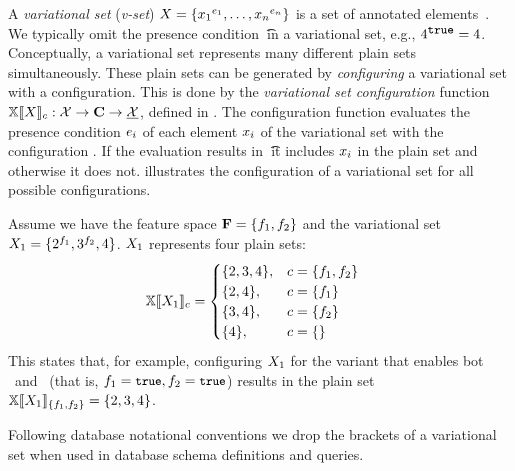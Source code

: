 A \emph{variational set} (\emph{v-set}) $\vset = \setDef {\annot [\dimMeta_1] {\elem_1},\ldots, \annot [\dimMeta_n] {\elem_n}}$ 
is a set of annotated elements~\cite{EWC13fosd,Walk14onward,ATW17dbpl}.
We typically omit the presence condition \t\ in a variational set,
e.g., $\annot [\t] 4 = 4$.
%
Conceptually, a variational set represents many different plain sets simultaneously.
These plain sets can be generated by \emph{configuring} a variational set with a configuration.
This is done by the \emph{variational set configuration} function
\ensuremath{\osetSem \vset: \vsetSet \to \confSet \to \psetSet}, defined in .
The configuration function evaluates the presence condition $\dimMeta_i$ of each 
element $\elem_i$ of the variational set with the configuration \config. 
If the evaluation results in \t\ it includes $\elem_i$ in the plain set and otherwise it
does not.  illustrates the configuration of a variational set for all
possible configurations. 

\begin{example}
\label{eg:vset-conf}
Assume we have the feature space $\fSet = \setDef {\A, \B}$ 
and the variational set $\vset_1 = \setDef {\annot [\A] 2, \annot [\B] 3, 4}$.
$\vset_1$ represents four plain sets:
\begin{alignat*}{1}
\osetSem {\vset_1} &=
\begin{cases}
  \setDef{2,3,4}, & \config = \setDef{\A,\B}\\
  \setDef{2,4}, & \config = \setDef{\A}\\
  \setDef{3,4}, & \config = \setDef{\B}\\
  \setDef{4}, & \config = \setDef { }
\end{cases}
\end{alignat*}
This states that, for example, configuring $\vset_1$ for the variant that enables 
bot \A\ and \B\ (that is, \ensuremath{\A = \t, \B = \t}) results in the plain set
\ensuremath{ \osetSem [\setDef {\A, \B}] {\vset_1} = \setDef {2,3,4} }.
\end{example}

%
Following database notational conventions
we drop the brackets of a variational set when used in database
schema definitions and queries.

